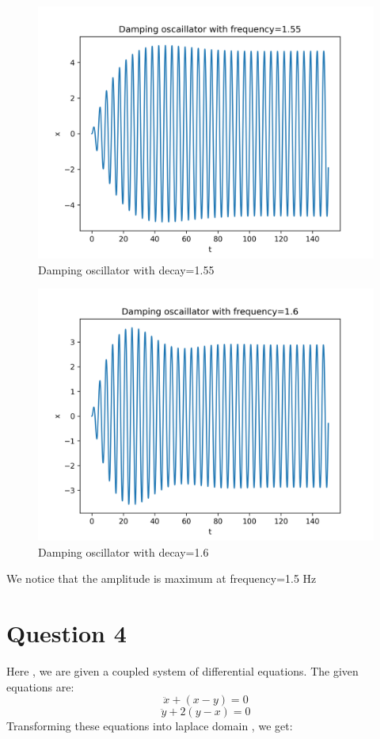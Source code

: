 \documentclass[11pt, a4paper]{article}
\begin{document}
\begin{figure}[!tbh]
\centering
\includegraphics[scale=0.7]{assgn7_plot6.png} 
\caption{Damping oscillator with decay=1.55}
\label{fig6}
\end{figure}

\begin{figure}[!tbh]
\centering
\includegraphics[scale=0.65]{assgn7_plot7.png} 
\caption{Damping oscillator with decay=1.6}
\label{fig7}
\end{figure}

We notice that the amplitude is maximum at frequency=1.5 Hz

\section*{Question 4}
Here , we are given a coupled system of differential equations.
The given equations are:
\begin{equation}
    \ddot x + (x-y) = 0
\end{equation} 
\begin{equation}
    \ddot y + 2(y-x) = 0
\end{equation}
Transforming these equations into laplace domain , we get:
\end{document}

